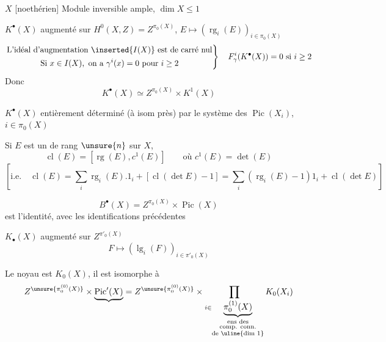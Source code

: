 $X$  [noethérien] 
Module inversible ample, $\dim X\leq1$

$K^\bullet(X)$ augmenté sur $H^0(X,Z)=Z^{\pi_0(X)}$, $E\longmapsto(\operatorname{rg}_i(E))_{i\in\pi_0(X)}$
\[
\left.\begin{gathered}
\text{L'idéal d'augmentation }\inserted{I(X)}\text{ est de carré nul}\\
\text{Si }x\in I(X),\text{ on a }\gamma^i(x)=0\text{ pour }i\geq2
\end{gathered}\right\}\quad F^i_\gamma(K^\bullet(X))=0\text{ si }i\geq2
\]
Donc
\[
K^\bullet(X)\simeq Z^{\pi_0(X)}\times K^1(X)
\]

 $K^\bullet(X)$ entièrement déterminé (à isom près) par le système des
$\operatorname{Pic}(X_i)$, $i\in\pi_0(X)$

Si $E$ est un  de rang $\unsure{n}$ sur $X$,
\[
\operatorname{cl}(E)=[\operatorname{rg}(E),c^1(E)]\qquad\text{où }c^1(E)=\det(E)
\]
\[
\left[\text{i.e.}\quad
\operatorname{cl}(E)=\sum_i\operatorname{rg}_i(E).1_i+[\operatorname{cl}(\det E)-1]
=\sum_i(\operatorname{rg}_i(E)-1)1_i+\operatorname{cl}(\det E)\right]
\]

\[
B^\bullet(X)=Z^{\pi_0(X)}\times\operatorname{Pic}(X)
\]
est l'identité, avec les identifications précédentes


$K_\bullet(X)$ augmenté sur $Z^{\pi'_0(X)}$
\[
F\longmapsto(\operatorname{lg}_i(F))_{i\in\pi'_0(X)}
\]
\margin{$[\unsure{\pi^{(1)}(X)|\pi_0^{(1)}(X)}=$ ens des composantes irréductibles \uuline{de dim 1}$]$}

Le noyau est $K_0(X)$, il est isomorphe à
\[
Z^{\unsure{\pi_0^{(0)}(X)}}\times\underbrace{\operatorname{Pic}'(X)}
=Z^{\unsure{\pi_0^{(0)}(X)}}\times
\prod_{i\in\underbrace{\pi_0^{(1)}(X)}_{\substack{\text{ens des}\\\text{comp. conn.}\\\text{de }\uline{\text{dim 1}}}}}K_0(X_i)
\]

